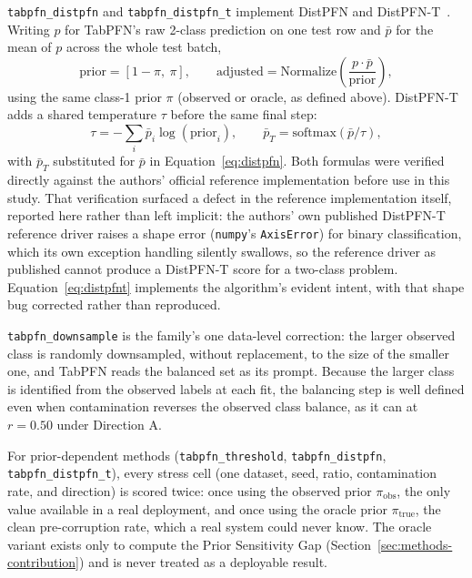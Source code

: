 \texttt{tabpfn\_distpfn} and \texttt{tabpfn\_distpfn\_t} implement
DistPFN and DistPFN-T~\cite{lee2026distpfn}. Writing $p$ for TabPFN's raw
2-class prediction on one test row and $\bar{p}$ for the mean of $p$ across
the whole test batch,
\begin{equation}
\text{prior} = [1-\pi,\ \pi], \qquad
\text{adjusted} = \text{Normalize}\!\left(\frac{p \cdot \bar{p}}{\text{prior}}\right),
\label{eq:distpfn}
\end{equation}
using the same class-1 prior $\pi$ (observed or oracle, as defined above).
DistPFN-T adds a shared temperature
$\tau$ before the same final step:
\begin{equation}
\tau = -\sum_i \bar{p}_i \log(\text{prior}_i), \qquad
\bar{p}_T = \text{softmax}(\bar{p}/\tau),
\label{eq:distpfnt}
\end{equation}
with $\bar{p}_T$ substituted for $\bar{p}$ in Equation~\ref{eq:distpfn}. Both
formulas were verified directly against the authors' official reference
implementation before use in this study. That verification surfaced a
defect in the reference implementation itself, reported here rather than
left implicit: the authors' own published DistPFN-T reference driver
raises a shape error (\texttt{numpy}'s \texttt{AxisError}) for binary
classification, which its own exception handling silently swallows, so the
reference driver as published cannot produce a DistPFN-T score for a
two-class problem. Equation~\ref{eq:distpfnt} implements the algorithm's
evident intent, with that shape bug corrected rather than reproduced.

\texttt{tabpfn\_downsample} is the family's one data-level correction: the larger observed class is randomly downsampled, without replacement, to the size of the smaller one, and TabPFN reads the balanced set as its prompt. Because the larger class is identified from the observed labels at each fit, the balancing step is well defined even when contamination reverses the observed class balance, as it can at $r{=}0.50$ under Direction A.

For prior-dependent methods (\texttt{tabpfn\_threshold},
\texttt{tabpfn\_distpfn}, \texttt{tabpfn\_distpfn\_t}), every stress cell
(one dataset, seed, ratio, contamination rate, and direction) is scored
twice: once using the observed prior $\pi_{\text{obs}}$, the only
value available in a real deployment, and once using the oracle prior
$\pi_{\text{true}}$, the clean pre-corruption rate, which a real system could
never know. The oracle variant exists only to compute the Prior Sensitivity
Gap (Section~\ref{sec:methods-contribution}) and is never treated as a
deployable result.

